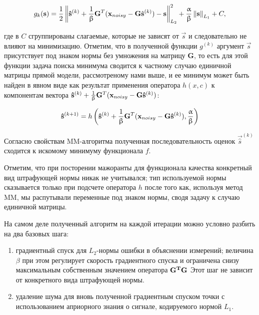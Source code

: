 \begin{equation}
    g_k(\mathbf{s}) =
    \frac{1}{2}\left\lVert\mathbf{\hat{s}}^{(k)} + \frac{1}{\upbeta} \mathbf{G}^T(\mathbf{x}_{noisy} - \mathbf{G} \hat{\mathbf{s}}^{(k)}) - \mathbf{s}\right\rVert^2_{L_2} + \frac{\upalpha}{\upbeta}\left\lVert\mathbf{s}\right\rVert_{L_1} + C,
\end{equation}

где в $C$ сгруппированы слагаемые, которые не зависят от $\vec{s}$ и
следовательно не влияют на минимизацию. Отметим, что в полученной функции
$g^{(k)}$ аргумент $\vec{s}$ присутствует под знаком нормы без умножения на
матрицу $\mathbf{G}$, то есть для этой функции задача поиска минимума сводится
к частному случаю единичной матрицы прямой модели, рассмотреному нами выше, и
ее минимум может быть найден в явном виде как результат применения оператора
$h(x, c)$ к компонентам вектора $\mathbf{\hat{s}}^{(k)} + \frac{1}{\upbeta} \mathbf{G}^T(\mathbf{x}_{noisy} - \mathbf{G} \mathbf{\hat{s}}^{(k)})$:

\begin{equation}
    \mathbf{\hat{s}}^{(k+1)} = h\left(\mathbf{\hat{s}}^{(k)} + \frac{1}{\upbeta} \mathbf{G}^T(\mathbf{x}_{noisy} - \mathbf{G} \mathbf{\hat{s}}^{(k)}), \frac{\upalpha}{\upbeta}\right)
    \label{eq:fista_next_iter_soft_thresh}
\end{equation}

Согласно свойствам MM-алгоритма полученная последовательность оценок
$\vec{\hat{s}}^{(k)}$ сходится к искомому минимуму функционала $f$.

Отметим, что при посторении мажоранты для функционала качества конкретный вид
штрафующей нормы никак не учитывался; тип используемой нормы сказывается только
при подсчете оператора $h$ после того как, используя метод MM, мы распутывали
переменные под знаком нормы, сводя задачу к случаю единичной матрицы.

На самом деле полученный алгоритм на каждой итерации можно условно разбить на два базовых
шага: 

\begin{enumerate}
    \item градиентный спуск для $L_2$-нормы ошибки в объяснении измерений;
        величина $\beta$ при этом регулирует скорость градиентного спуска и ограничена
        снизу максимальным собственным значением оператора $\mathbf{G^TG}$
        Этот шаг не зависит от конкретного вида штрафующей нормы.
    \item удаление шума для вновь полученной градиентным спуском точки с
        использованием априорного знания о сигнале, кодируемого нормой $L_1$.
\end{enumerate}

